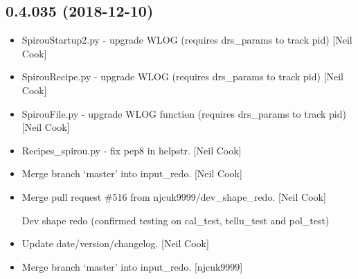 \documentclass[a4paper,10pt,english]{report}
\begin{document}
\subsection{0.4.035 (2018-12-10)}
\label{\detokenize{misc/changelog:id240}}\begin{itemize}
\item {} 
SpirouStartup2.py - upgrade WLOG (requires drs\_params to track pid)
{[}Neil Cook{]}

\item {} 
SpirouRecipe.py - upgrade WLOG (requires drs\_params to track pid)
{[}Neil Cook{]}

\item {} 
SpirouFile.py - upgrade WLOG function (requires drs\_params to track
pid) {[}Neil Cook{]}

\item {} 
Recipes\_spirou.py - fix pep8 in helpstr. {[}Neil Cook{]}

\item {} 
Merge branch ‘master’ into input\_redo. {[}Neil Cook{]}

\item {} 
Merge pull request \#516 from njcuk9999/dev\_shape\_redo. {[}Neil Cook{]}

Dev shape redo (confirmed testing on cal\_test, tellu\_test and pol\_test)

\item {} 
Update date/version/changelog. {[}Neil Cook{]}

\item {} 
Merge branch ‘master’ into input\_redo. {[}njcuk9999{]}

\end{itemize}
\end{document}
